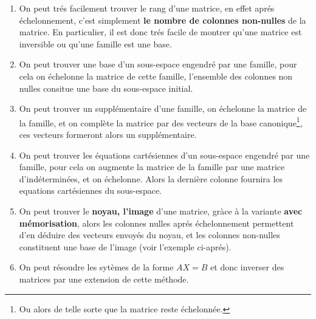 \begin{enumerate}
   \item On peut trés facilement trouver le rang d'une matrice, en effet aprés échelonnement, c'est simplement \textbf{le nombre de colonnes non-nulles} de la matrice. En particulier, il est donc trés facile de montrer qu'une matrice est inversible ou qu'une famille est une base.
   \item On peut trouver une base d'un sous-espace engendré par une famille, pour cela on échelonne la matrice de cette famille, l'ensemble des colonnes non nulles consitue une base du sous-espace initial.
   \item On peut trouver un supplémentaire d'une famille, on échelonne la matrice de la famille, et on complète la matrice par des vecteurs de la base canonique\footnote[2]{Ou alors de telle sorte que la matrice reste échelonnée.}, ces vecteurs formeront alors un supplémentaire.
   \item On peut trouver les équations cartésiennes d'un sous-espace engendré par une famille, pour cela on augmente la matrice de la famille par une matrice d'indéterminées, et on échelonne. Alors la dernière colonne fournira les equations cartésiennes du sous-espace.
   \item On peut trouver le \textbf{noyau, l'image} d'une matrice, gràce à la variante \textbf{avec mémorisation}, alors les colonnes nulles aprés échelonnement permettent d'en déduire des vecteurs envoyés du noyau, et les colonnes non-nulles constituent une base de l'image (voir l'exemple ci-aprés).
   \item On peut résoudre les sytèmes de la forme \( AX = B \) et donc inverser des matrices par une extension de cette méthode.
\end{enumerate}
